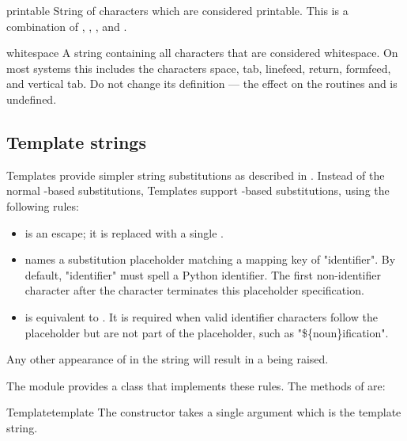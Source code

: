 \begin{datadesc}{printable}
  String of characters which are considered printable.  This is a
  combination of , ,
  , and .
\end{datadesc}

\begin{datadesc}{whitespace}
  A string containing all characters that are considered whitespace.
  On most systems this includes the characters space, tab, linefeed,
  return, formfeed, and vertical tab.  Do not change its definition ---
  the effect on the routines  and 
  is undefined.
\end{datadesc}

\subsection{Template strings}

Templates provide simpler string substitutions as described in .
Instead of the normal \samp{\%}-based substitutions, Templates support
\samp{\$}-based substitutions, using the following rules:

\begin{itemize}
\item \samp{\$\$} is an escape; it is replaced with a single \samp{\$}.

\item {} names a substitution placeholder matching a mapping
       key of "identifier".  By default, "identifier" must spell a Python
       identifier.  The first non-identifier character after the \samp{\$}
       character terminates this placeholder specification.

\item {} is equivalent to .  It is
      required when valid identifier characters follow the placeholder but are
      not part of the placeholder, such as "\$\{noun\}ification".
\end{itemize}

Any other appearance of \samp{\$} in the string will result in a
 being raised.


The  module provides a  class that implements
these rules.  The methods of  are:

\begin{classdesc}{Template}{template}
The constructor takes a single argument which is the template string.
\end{classdesc}

